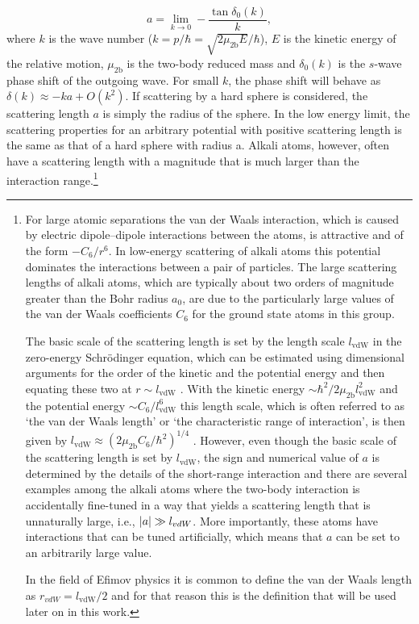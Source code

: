 \begin{equation} \label{eq:2}
a = \lim_{k \to 0} -\frac{\tan\delta_0(k)}{k},
\end{equation}
where $k$ is the wave number ($k=p/\hbar = \sqrt{2\mu_{2\mathrm{b}} E}/\hbar$), $E$ is the kinetic energy of the relative motion, $\mu_{2\mathrm{b}}$ is the two-body reduced mass and $\delta_0(k)$ is the $s$-wave phase shift of the outgoing wave. For small $k$, the phase shift will behave as $\delta(k)\approx-ka + O(k^2)$. If scattering by a hard sphere is considered, the scattering length $a$ is simply the radius of the sphere. In the low energy limit, the scattering properties for an arbitrary potential with positive scattering length is the same as that of a hard sphere with radius a. Alkali atoms, however, often have a scattering length with a magnitude that is much larger than the interaction range.\footnote{For large atomic separations the van der Waals interaction, which is caused by electric dipole--dipole interactions between the atoms, is attractive and of the form $-C_6/r^6$. In low-energy scattering of alkali atoms this potential dominates the interactions between a pair of particles. The large scattering lengths of alkali atoms, which are typically about two orders of magnitude greater than the Bohr radius $a_0$, are due to the particularly large values of the van der Waals coefficients $C_6$ for the ground state atoms in this group. 
	
The basic scale of the scattering length is set by the length scale $l_{\mathrm{vdW}}$ in the zero-energy Schr{\"o}dinger equation, which can be estimated using dimensional arguments for the order of the kinetic and the potential energy and then equating these two at $r \sim l_{\mathrm{vdW}}$  \cite{pethick_smith_2008}. With the kinetic energy $ \sim \hbar^2/2\mu_{2\mathrm{b}}l_{\mathrm{vdW}}^2$ and the potential energy $ \sim C_6/l_{\mathrm{vdW}}^6$ this length scale, which is often referred to as `the van der Waals length' or `the characteristic range of interaction', is then given by $l_{\mathrm{vdW}} \approx (2\mu_{2\mathrm{b}} C_6/\hbar^2)^{1/4}$ \cite{BRAATEN2006}. However, even though the basic scale of the scattering length is set by $l_{\mathrm{vdW}}$, the sign and numerical value of $a$ is determined by the details of the short-range interaction and there are several examples among the alkali atoms where the two-body interaction is accidentally fine-tuned in a way that yields a scattering length that is unnaturally large, i.e., $\lvert a\rvert \gg l_{vdW}$. More importantly, these atoms have interactions that can be tuned artificially, which means that $a$ can be set to an arbitrarily large value.

In the field of Efimov physics it is common to define the van der Waals length as $r_{vdW}=l_{\mathrm{vdW}}/2$ and for that reason this is the definition that will be used later on in this work.} 
